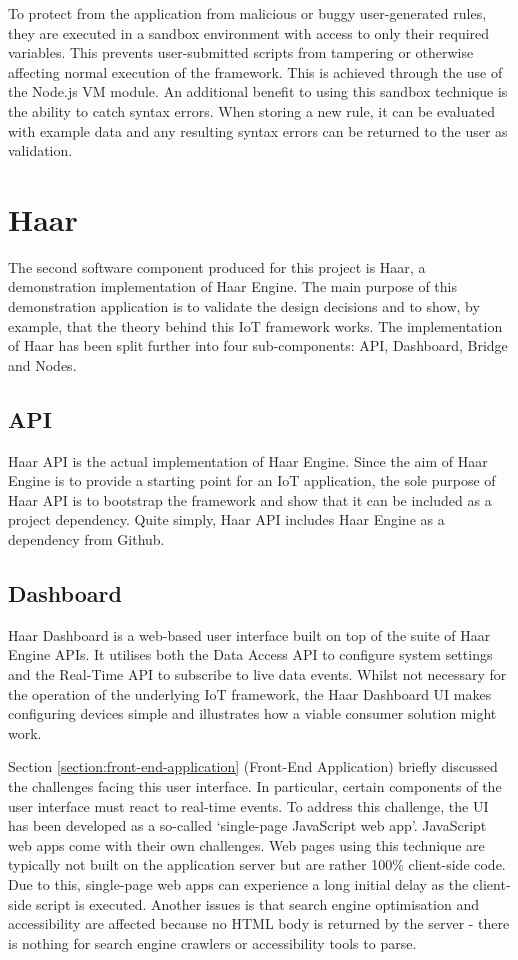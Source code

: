     To protect from the application from malicious or buggy user-generated rules, they are executed in a sandbox environment with access to only their required variables. This prevents user-submitted scripts from tampering or otherwise affecting normal execution of the framework. This is achieved through the use of the Node.js VM module. An additional benefit to using this sandbox technique is the ability to catch syntax errors. When storing a new rule, it can be evaluated with example data and any resulting syntax errors can be returned to the user as validation.

  \section{Haar}
    The second software component produced for this project is Haar, a demonstration implementation of Haar Engine. The main purpose of this demonstration application is to validate the design decisions and to show, by example, that the theory behind this IoT framework works. The implementation of Haar has been split further into four sub-components: API, Dashboard, Bridge and Nodes.

    \subsection{API}
      Haar API is the actual implementation of Haar Engine. Since the aim of Haar Engine is to provide a starting point for an IoT application, the sole purpose of Haar API is to bootstrap the framework and show that it can be included as a project dependency. Quite simply, Haar API includes Haar Engine as a dependency from Github.

    \subsection{Dashboard}
      Haar Dashboard is a web-based user interface built on top of the suite of Haar Engine APIs. It utilises both the Data Access API to configure system settings and the Real-Time API to subscribe to live data events. Whilst not necessary for the operation of the underlying IoT framework, the Haar Dashboard UI makes configuring devices simple and illustrates how a viable consumer solution might work.

      Section \ref{section:front-end-application} (Front-End Application) briefly discussed the challenges facing this user interface. In particular, certain components of the user interface must react to real-time events. To address this challenge, the UI has been developed as a so-called `single-page JavaScript web app'. JavaScript web apps come with their own challenges. Web pages using this technique are typically not built on the application server but are rather 100\% client-side code. Due to this, single-page web apps can experience a long initial delay as the client-side script is executed. Another issues is that search engine optimisation and accessibility are affected because no HTML body is returned by the server - there is nothing for search engine crawlers or accessibility tools to parse.

